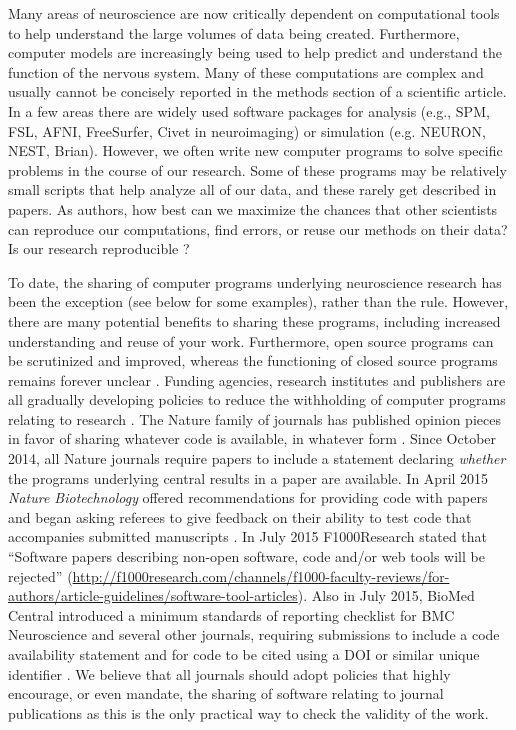 \documentclass[11pt]{article}
\begin{document}
Many areas of neuroscience are now critically dependent on
computational tools to help understand the large volumes of data being
created.  Furthermore, computer models are increasingly being used to
help predict and understand the function of the nervous system.  Many
of these computations are complex and usually cannot be concisely
reported in the methods section of a scientific article.  In a few
areas there are widely used software packages for
analysis (e.g., SPM, FSL, AFNI, FreeSurfer, Civet in
neuroimaging) or simulation (e.g. NEURON, NEST, Brian).
However, we often write new computer programs to solve
specific problems in the course of our research.  Some of these
programs may be relatively small scripts that help analyze all of our
data, and these rarely get described in papers.  As authors, how best
can we maximize the chances that other scientists can reproduce our
computations, find errors, or reuse our methods on their data?  Is our research
reproducible \cite{web:naturefocus}?

To date, the sharing of computer programs underlying neuroscience
research has been the exception (see below for some examples), rather
than the rule.  However, there are many potential benefits to sharing
these programs, including increased understanding and reuse of your
work.  Furthermore, open source programs can be scrutinized and
improved, whereas the functioning of closed source programs remains
forever unclear \cite{Vihinen2015}.  Funding agencies, research
institutes and publishers are all gradually developing policies to
reduce the withholding of computer programs relating to research
\cite{Morin2012-65e}.  The Nature family of journals has published
opinion pieces in favor of sharing whatever code is available, in
whatever form \cite{Barnes2010-iv,Ince2012-225}.  Since October 2014,
all Nature journals require papers to include a statement declaring
\textit{whether} the programs underlying central results in a paper
are available. In April 2015 \textit{Nature Biotechnology} offered
recommendations for providing code with papers and began asking
referees to give feedback on their ability to test code that
accompanies submitted manuscripts \cite{NatBiotech2015}.  In July 2015
F1000Research stated that ``Software papers describing non-open
software, code and/or web tools will be rejected''
(\url{http://f1000research.com/channels/f1000-faculty-reviews/for-authors/article-guidelines/software-tool-articles}). Also
in July 2015, BioMed Central introduced a minimum standards of
reporting checklist for BMC Neuroscience and several other journals,
requiring submissions to include a code availability statement and for
code to be cited using a DOI or similar unique identifier
\cite{Kenall2015}.  We believe that all journals should adopt policies
that highly encourage, or even mandate, the sharing of software
relating to journal publications as this is the only practical way to
check the validity of the work.
\end{document}
